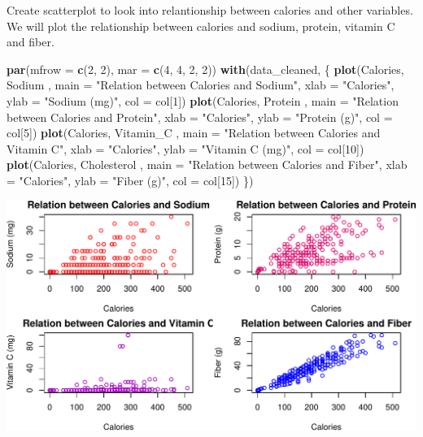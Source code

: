 \documentclass[
]{article}
\newenvironment{Shaded}{\begin{snugshade}}{\end{snugshade}}
\newcommand{\AttributeTok}[1]{\textcolor[rgb]{0.13,0.29,0.53}{#1}}
\newcommand{\DecValTok}[1]{\textcolor[rgb]{0.00,0.00,0.81}{#1}}
\newcommand{\FunctionTok}[1]{\textcolor[rgb]{0.13,0.29,0.53}{\textbf{#1}}}
\newcommand{\NormalTok}[1]{#1}
\newcommand{\StringTok}[1]{\textcolor[rgb]{0.31,0.60,0.02}{#1}}
\begin{document}
Create scatterplot to look into relantionship between calories and other
variables. We will plot the relationship between calories and sodium,
protein, vitamin C and fiber.

\begin{Shaded}
\begin{Highlighting}[]
\FunctionTok{par}\NormalTok{(}\AttributeTok{mfrow =} \FunctionTok{c}\NormalTok{(}\DecValTok{2}\NormalTok{, }\DecValTok{2}\NormalTok{), }\AttributeTok{mar =} \FunctionTok{c}\NormalTok{(}\DecValTok{4}\NormalTok{, }\DecValTok{4}\NormalTok{, }\DecValTok{2}\NormalTok{, }\DecValTok{2}\NormalTok{))}
\FunctionTok{with}\NormalTok{(data\_cleaned, \{}
  \FunctionTok{plot}\NormalTok{(Calories, Sodium , }\AttributeTok{main =} \StringTok{"Relation between Calories and Sodium"}\NormalTok{,}
       \AttributeTok{xlab =} \StringTok{"Calories"}\NormalTok{, }\AttributeTok{ylab =} \StringTok{"Sodium (mg)"}\NormalTok{, }\AttributeTok{col =}\NormalTok{ col[}\DecValTok{1}\NormalTok{])}
  \FunctionTok{plot}\NormalTok{(Calories, Protein , }\AttributeTok{main =} \StringTok{"Relation between Calories and Protein"}\NormalTok{,}
       \AttributeTok{xlab =} \StringTok{"Calories"}\NormalTok{, }\AttributeTok{ylab =} \StringTok{"Protein (g)"}\NormalTok{, }\AttributeTok{col =}\NormalTok{ col[}\DecValTok{5}\NormalTok{])}
  \FunctionTok{plot}\NormalTok{(Calories, Vitamin\_C , }\AttributeTok{main =} \StringTok{"Relation between Calories and Vitamin C"}\NormalTok{,}
       \AttributeTok{xlab =} \StringTok{"Calories"}\NormalTok{, }\AttributeTok{ylab =} \StringTok{"Vitamin C (mg)"}\NormalTok{, }\AttributeTok{col =}\NormalTok{ col[}\DecValTok{10}\NormalTok{])}
  \FunctionTok{plot}\NormalTok{(Calories, Cholesterol , }\AttributeTok{main =} \StringTok{"Relation between Calories and Fiber"}\NormalTok{,}
       \AttributeTok{xlab =} \StringTok{"Calories"}\NormalTok{, }\AttributeTok{ylab =} \StringTok{"Fiber (g)"}\NormalTok{, }\AttributeTok{col =}\NormalTok{ col[}\DecValTok{15}\NormalTok{])}
\NormalTok{\})}
\end{Highlighting}
\end{Shaded}

\begin{center}\includegraphics{Statistical_Learning_Final_Report_files/figure-latex/scatterplot-1} \end{center}
\end{document}
